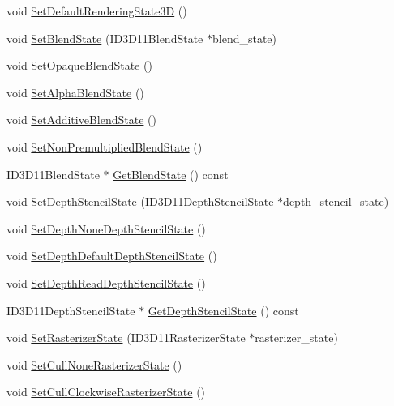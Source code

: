 \begin{DoxyCompactItemize}
\item 
void \hyperlink{structmage_1_1_rendering_state_ac6029d9fdc873317b97f60d59b88e7a7}{Set\+Default\+Rendering\+State3D} ()
\item 
void \hyperlink{structmage_1_1_rendering_state_a6f5c6b0bf031db9c3cf255356b4f383a}{Set\+Blend\+State} (I\+D3\+D11\+Blend\+State $\ast$blend\+\_\+state)
\item 
void \hyperlink{structmage_1_1_rendering_state_ab0f578405f3c880234757e152be1a670}{Set\+Opaque\+Blend\+State} ()
\item 
void \hyperlink{structmage_1_1_rendering_state_a7f97752f22b0a32912f24d16c1aa2441}{Set\+Alpha\+Blend\+State} ()
\item 
void \hyperlink{structmage_1_1_rendering_state_a61341d0fc7f1140faaf8fb33f9bb13fb}{Set\+Additive\+Blend\+State} ()
\item 
void \hyperlink{structmage_1_1_rendering_state_acf313a797964e3a86dde2799a42f2db3}{Set\+Non\+Premultiplied\+Blend\+State} ()
\item 
I\+D3\+D11\+Blend\+State $\ast$ \hyperlink{structmage_1_1_rendering_state_a72fec4a686de92afdb32a38907fb8e00}{Get\+Blend\+State} () const
\item 
void \hyperlink{structmage_1_1_rendering_state_abd2c63744e29e526e145bcacb3e07867}{Set\+Depth\+Stencil\+State} (I\+D3\+D11\+Depth\+Stencil\+State $\ast$depth\+\_\+stencil\+\_\+state)
\item 
void \hyperlink{structmage_1_1_rendering_state_a67db088d08560ab5f3adde28032972a4}{Set\+Depth\+None\+Depth\+Stencil\+State} ()
\item 
void \hyperlink{structmage_1_1_rendering_state_a88933420c94d4127973d8148ccd97e86}{Set\+Depth\+Default\+Depth\+Stencil\+State} ()
\item 
void \hyperlink{structmage_1_1_rendering_state_a86ff2bb5739ada7ffcc275f4624d2a24}{Set\+Depth\+Read\+Depth\+Stencil\+State} ()
\item 
I\+D3\+D11\+Depth\+Stencil\+State $\ast$ \hyperlink{structmage_1_1_rendering_state_aefe2d1e5e2b2f5b3043724eed3c9ea44}{Get\+Depth\+Stencil\+State} () const
\item 
void \hyperlink{structmage_1_1_rendering_state_a067596b397a607f5016b2f8ef9e7dd2e}{Set\+Rasterizer\+State} (I\+D3\+D11\+Rasterizer\+State $\ast$rasterizer\+\_\+state)
\item 
void \hyperlink{structmage_1_1_rendering_state_a4841e36e7be34f949da1d4088f217a1a}{Set\+Cull\+None\+Rasterizer\+State} ()
\item 
void \hyperlink{structmage_1_1_rendering_state_a707034239265916d82e7dbe168f09cb6}{Set\+Cull\+Clockwise\+Rasterizer\+State} ()

\end{DoxyCompactItemize}
